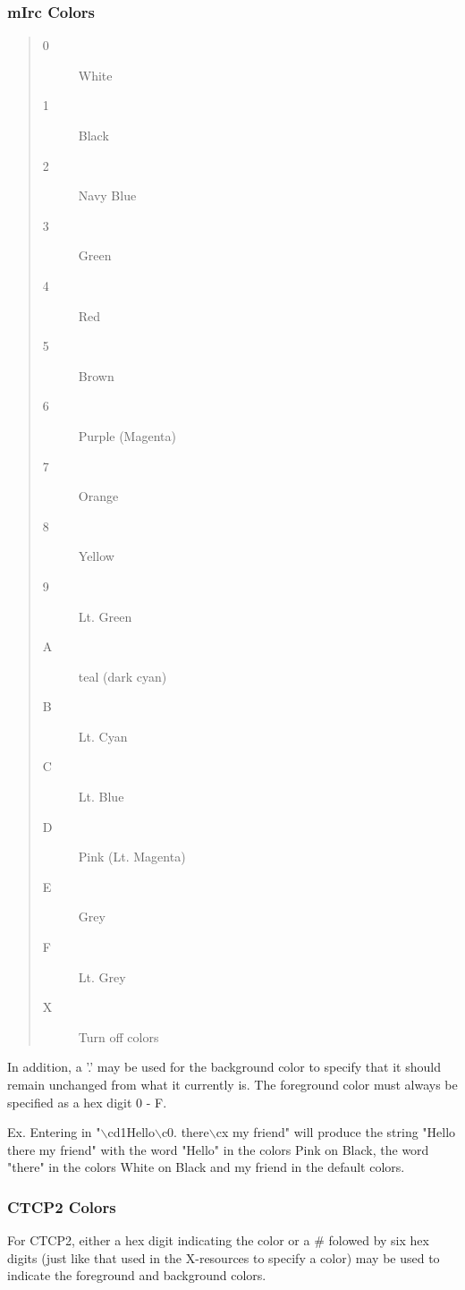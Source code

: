 \documentclass[titlepage]{article}
\begin{document}
\subsubsection{mIrc Colors}
\begin{quote}
\begin{description}
\item[0] White
\item[1] Black
\item[2] Navy Blue
\item[3] Green
\item[4] Red
\item[5] Brown
\item[6] Purple (Magenta)
\item[7] Orange
\item[8] Yellow
\item[9] Lt. Green
\item[A] teal (dark cyan)
\item[B] Lt. Cyan
\item[C] Lt. Blue
\item[D] Pink (Lt. Magenta)
\item[E] Grey
\item[F] Lt. Grey
\item[X] Turn off colors
\end{description}
\end{quote}

In addition, a '.' may be used for the background color to specify that it should
remain unchanged from what it currently is. The foreground color must always be
specified as a hex digit 0 - F. 

Ex. Entering in "$\backslash$cd1Hello$\backslash$c0. there$\backslash$cx my friend" will produce
the string "Hello there my friend" with the word "Hello" in the colors Pink on Black,
the word "there" in the colors White on Black and my friend in the default colors.

\subsubsection{CTCP2 Colors}
For CTCP2, either a hex digit indicating the color or a \# folowed by six hex digits
(just like that used in the X-resources to specify a color)
may be used to indicate the foreground and background colors.
\end{document}
